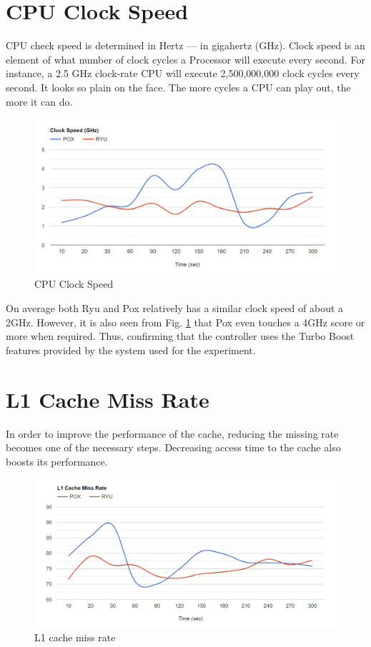 \section{CPU Clock Speed}

CPU check speed is determined in Hertz — in gigahertz (GHz). Clock speed is an element of what number of clock cycles a Processor will execute every second. For instance, a 2.5 GHz clock-rate CPU will execute 2,500,000,000 clock cycles every second. It looks so plain on the face. The more cycles a CPU can play out, the more it can do.

\begin{figure}[!hbt]
    \centering
        \includegraphics[width=\textwidth,keepaspectratio]{images/clock_speed.png}
       \caption{CPU Clock Speed}
        \label{clockspeed}
\end{figure}

On average both Ryu and Pox relatively has a similar clock speed of about a 2GHz. However, it is also seen from Fig. \ref{clockspeed} that Pox even touches a 4GHz score or more when required. Thus, confirming that the controller uses the Turbo Boost features provided by the system used for the experiment.

\section{L1 Cache Miss Rate}

In order to improve the performance of the cache, reducing the missing rate becomes one of the necessary steps. Decreasing access time to the cache also boosts its performance.

\begin{figure}[!hbt]
    \centering
        \includegraphics[width=\textwidth,keepaspectratio]{images/l1_miss_rate.png}
       \caption{L1 cache miss rate}
        \label{l1missrate}
\end{figure}

